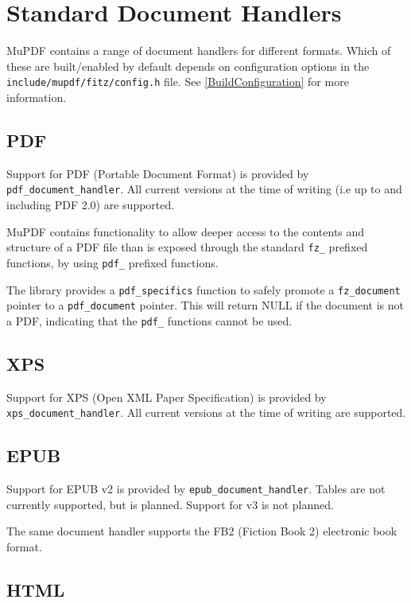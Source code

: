 \documentclass[oneside]{book}
\newcommand{\rjwref}[1] {\autoref{#1} \nameref{#1}}
\begin{document}
\section{Standard Document Handlers}

MuPDF contains a range of document handlers for different formats. Which of these are built/enabled by default depends on configuration options in the \texttt{include/mupdf/fitz/config.h} file. See \rjwref{BuildConfiguration} for more information.

\subsection{PDF}

Support for PDF (Portable Document Format) is provided by \texttt{pdf\_document\_handler}. All current versions at the time of writing (i.e  up to and including PDF 2.0) are supported.

MuPDF contains functionality to allow deeper access to the contents and structure of a PDF file than is exposed through the standard \texttt{fz\_} prefixed functions, by using \texttt{pdf\_} prefixed functions.

The library provides a \texttt{pdf\_specifics} function to safely promote a \texttt{fz\_document} pointer to a \texttt{pdf\_document} pointer. This will return NULL if the document is not a PDF, indicating that the \texttt{pdf\_} functions cannot be used.

\subsection{XPS}

Support for XPS (Open XML Paper Specification) is provided by \texttt{xps\_document\_handler}. All current versions at the time of writing are supported.

\subsection{EPUB}

Support for EPUB v2 is provided by \texttt{epub\_document\_handler}. Tables are not currently supported, but is planned. Support for v3 is not planned.

The same document handler supports the FB2 (Fiction Book 2) electronic book format.

\subsection{HTML}
\end{document}
